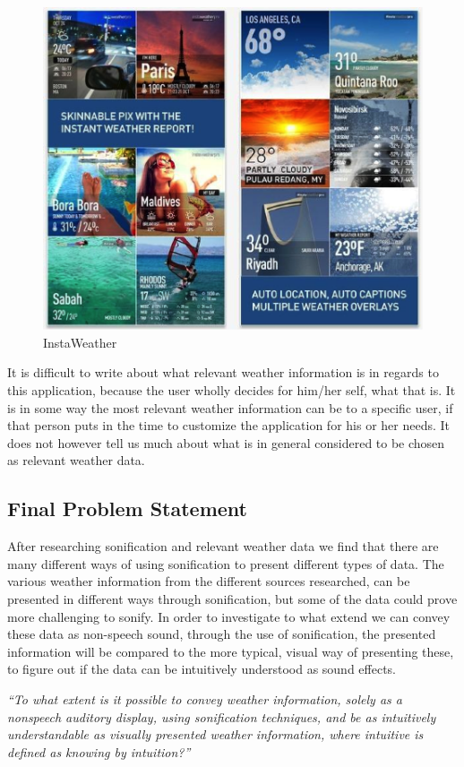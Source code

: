 \begin{figure}[!htbp]
    \centering
    \includegraphics[width=.7\textwidth]{images/Instaweather1.png}
    \caption{InstaWeather}
    \label{fig:instaweather1}
\end{figure}

It is difficult to write about what relevant weather information is in regards to this application, because the user wholly decides for him/her self, what that is. 
It is in some way the most relevant weather information can be to a specific user, if that person puts in the time to customize the application for his or her needs. 
It does not however tell us much about what is in general considered to be chosen as relevant weather data.




\subsection{Final Problem Statement} %
\label{sub:final_problem_statement}

After researching sonification and relevant weather data we find that there are many different ways of using sonification to present different types of data. 
The various weather information from the different sources researched, can be presented in different ways through sonification, but some of the data could prove more challenging to sonify. 
In order to investigate to what extend we can convey these data as non-speech sound, through the use of sonification, the presented information will be compared to the more typical, visual way of presenting these, to figure out if the data can be intuitively understood as sound effects.


\textit{``To what extent is it possible to convey weather information, solely as a nonspeech auditory display, using sonification techniques, and be as intuitively understandable as visually presented weather information, where intuitive is defined as knowing by intuition?''}


